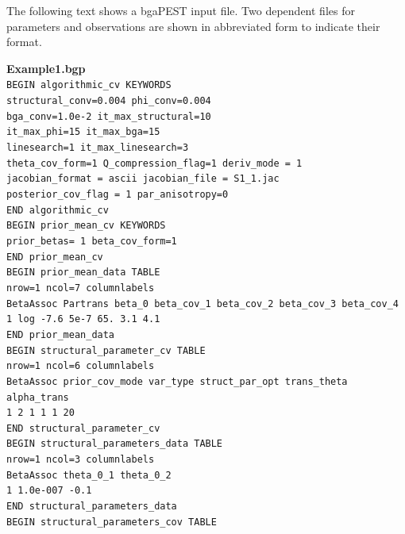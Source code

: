 \documentclass[11pt,oneside,onecolumn]{usgsreport}
\begin{document}
\begin{appendix}
\begin{bibunit}
The following text shows a bgaPEST input file. Two dependent files
for parameters and observations are shown in abbreviated form to indicate
their format.
\begin{verse}
\texttt{\newline{}}
\end{verse}

\textbf{Example1.bgp} \\
\texttt{BEGIN algorithmic\_cv KEYWORDS \\
structural\_conv=0.004 phi\_conv=0.004 \\
bga\_conv=1.0e-2 it\_max\_structural=10 \\
it\_max\_phi=15 it\_max\_bga=15 \\
linesearch=1 it\_max\_linesearch=3 \\
theta\_cov\_form=1 Q\_compression\_flag=1 deriv\_mode = 1 \\
jacobian\_format = ascii jacobian\_file = S1\_1.jac \\
posterior\_cov\_flag = 1 par\_anisotropy=0 \\
END algorithmic\_cv \\
BEGIN prior\_mean\_cv KEYWORDS \\
prior\_betas= 1 beta\_cov\_form=1 \\
END prior\_mean\_cv \\
BEGIN prior\_mean\_data TABLE \\
nrow=1 ncol=7 columnlabels \\
BetaAssoc Partrans beta\_0 beta\_cov\_1 beta\_cov\_2 beta\_cov\_3 beta\_cov\_4 \\
1 log -7.6 5e-7 65. 3.1 4.1 \\
END prior\_mean\_data \\
BEGIN structural\_parameter\_cv TABLE \\
nrow=1 ncol=6 columnlabels \\
BetaAssoc prior\_cov\_mode var\_type struct\_par\_opt trans\_theta alpha\_trans \\
1 2 1 1 1 20 \\
END structural\_parameter\_cv \\
BEGIN structural\_parameters\_data TABLE\\
nrow=1 ncol=3 columnlabels \\
BetaAssoc theta\_0\_1 theta\_0\_2 \\
1 1.0e-007 -0.1 \\
END structural\_parameters\_data\\
BEGIN structural\_parameters\_cov TABLE \\
}
\end{bibunit}
\end{appendix}
\end{document}
